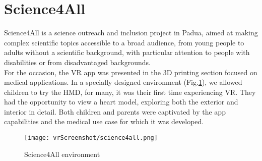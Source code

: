 \section{Science4All}
\noindent
Science4All is a science outreach and inclusion project in Padua, aimed at making complex scientific topics accessible to a broad audience,
from young people to adults without a scientific background, with particular attention to people with disabilities or from disadvantaged backgrounds.\\
For the occasion, the \ac{VR} app was presented in the 3D printing section focused on medical applications. In a specially designed environment (Fig.\ref{fig:science4all}), we allowed children to try the \ac{HMD}, for many, it was their first time experiencing VR. They had the opportunity to view a heart model, exploring both the exterior and interior in detail.
Both children and parents were captivated by the app capabilities and the medical use case for which it was developed.

\begin{figure}[ht]
  \centering
  \texttt{[image: vrScreenshot/science4all.png]}
  \caption{Science4All environment}
  \label{fig:science4all}
\end{figure}